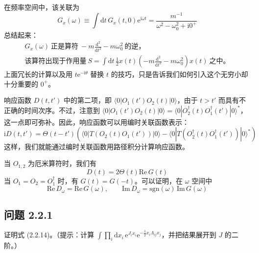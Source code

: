 在频率空间中，该关联为
\begin{equation*}
G_x(\omega)\equiv\int\mathrm{d}t\,G_x(t,0)\mathrm{e}^{\mathrm{i}\omega t}=\frac{m^{-1}}{\omega^2-\omega_0^2+\mathrm{i}0^+}\tag{2.2.17}
\end{equation*}
总结起来：
\begin{equation*}
\boxed{\begin{gathered}
G_x(\omega)\ \text{正是算符}\ -m\frac{\mathrm{d}^2}{\mathrm{d}t^2}-m\omega_0^2\ \text{的逆，}\\
\text{该算符出现于作用量}\ S=\int\mathrm{d}t\,\frac{1}{2}x(t)\left(-m\frac{\mathrm{d}^2}{\mathrm{d}t^2}-m\omega_0^2\right)x(t)\ \text{之中。}
\end{gathered}}
\end{equation*}
上面冗长的计算以及用 $t\mathrm{e}^{-\mathrm{i}\theta}$ 替换 $t$ 的技巧，只是告诉我们如何引入这个无穷小却十分重要的 $0^+$。

响应函数 $D(t,t')$ 中的第二项，即 $\langle 0|O_1(t')O_2(t)|0\rangle$，由于 $t>t'$ 而具有不正确的时间次序。不过，注意到 $\langle 0|O_1(t')O_2(t)|0\rangle=\langle 0|O_2^\dagger(t)O_1^\dagger(t')|0\rangle^*$，这一点即可弥补。因此，响应函数可以用编时关联函数表示：
\begin{equation*}
\mathrm{i}D(t,t')=\Theta(t-t')\left(\langle 0|T(O_2(t)O_1(t'))|0\rangle-\langle 0|T(O_2^\dagger(t)O_1^\dagger(t'))|0\rangle^*\right)
\end{equation*}
这样，我们就能通过编时关联函数用路径积分计算响应函数。

当 $O_{1,2}$ 为厄米算符时，我们有
\begin{equation*}
D(t)=2\Theta(t)\mathrm{Re}\,G(t)\tag{2.2.18}
\end{equation*}
当 $O_1=O_2=O_1^\dagger$ 时，有 $G(t)=G(-t)$。可以证明，在 $\omega$ 空间中
\begin{equation*}
\boxed{\ \mathrm{Re}\,D_\omega=\mathrm{Re}\,G(\omega),\qquad \mathrm{Im}\,D_\omega=\mathrm{sgn}(\omega)\,\mathrm{Im}\,G(\omega)\ }\tag{2.2.19}
\end{equation*}


\subsection*{问题 2.2.1}

证明式 (2.2.14)。（提示：计算 $\int\prod_i\mathrm{d}x_i\,\mathrm{e}^{J_ix_i}\mathrm{e}^{-\frac{1}{2}x_i\Lambda_{ij}x_j}$，并把结果展开到 $J$ 的二阶。）

